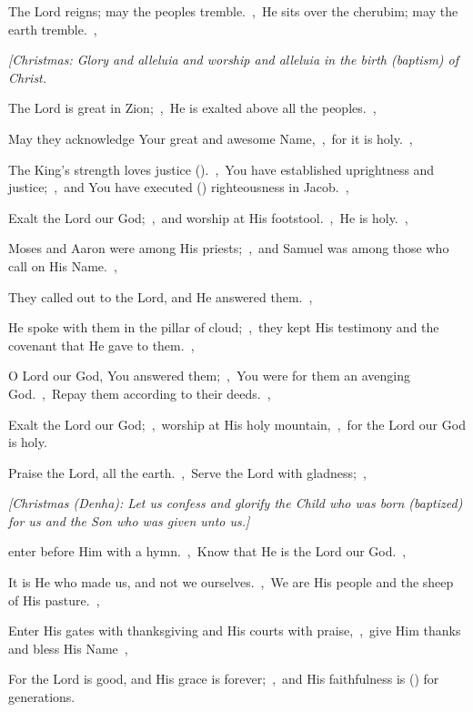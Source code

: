 \documentclass[12pt,twoside,a5paper]{article}
\begin{document}

\begin{normalparskip}
  The Lord reigns; may the peoples tremble.~\sep\ He sits over the cherubim; may the earth tremble.~\sep


  \emph{[Christmas: Glory and alleluia and worship and alleluia in the birth (baptism) of Christ.}

  The Lord is great in Zion;~\sep\ He is exalted above all the peoples.~\sep

  May they acknowledge Your great and awesome Name,~\sep\ for it is holy.~\sep

  The King's strength loves justice ().~\sep\ You have established uprightness and justice;~\sep\ and You have executed () righteousness in Jacob.~\sep

  Exalt the Lord our God;~\sep\ and worship at His footstool.~\sep\ He is holy.~\sep

  Moses and Aaron were among His priests;~\sep\ and Samuel was among those who call on His Name.~\sep

  They called out to the Lord, and He answered them.~\sep

  He spoke with them in the pillar of cloud;~\sep\ they kept His testimony and the covenant that He gave to them.~\sep

  O Lord our God, You answered them;~\sep\ You were for them an avenging God.~\sep\ Repay them according to their deeds.~\sep

  Exalt the Lord our God;~\sep\ worship at His holy mountain,~\sep\ for the Lord our God is holy.
\end{normalparskip}


\begin{normalparskip}
  Praise the Lord, all the earth.~\sep\ Serve the Lord with gladness;~\sep


  \emph{[Christmas (Denha): Let us confess and glorify the Child who was born (baptized) for us and the Son who was given unto us.]}

  enter before Him with a hymn.~\sep\ Know that He is the Lord our God.~\sep

  It is He who made us, and not we ourselves.~\sep\ We are His people and the sheep of His pasture.~\sep

  Enter His gates with thanksgiving and His courts with praise,~\sep\ give Him thanks and bless His Name~\sep

  For the Lord is good, and His grace is forever;~\sep\ and His faithfulness is () for generations.
\end{normalparskip}
\end{document}
